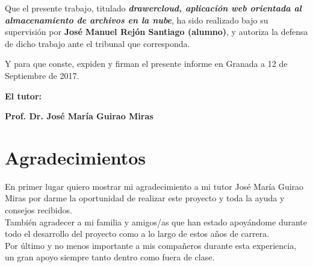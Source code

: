 \vspace{0.5cm}

Que el presente trabajo, titulado \textit{\textbf{drawercloud, aplicación web orientada al almacenamiento de archivos en la nube}},
ha sido realizado bajo su supervisión por \textbf{José Manuel Rejón Santiago (alumno)}, y autoriza la defensa de dicho trabajo ante el tribunal
que corresponda.

\vspace{0.5cm}

Y para que conste, expiden y firman el presente informe en Granada a 12 de Septiembre de 2017.

\vspace{1cm}

\textbf{El tutor:}

\vspace{5cm}

\noindent \textbf{Prof. Dr. José María Guirao Miras}

\chapter*{Agradecimientos}
\thispagestyle{empty}

       \vspace{1cm}


En primer lugar quiero mostrar mi agradecimiento a mi tutor José María Guirao Miras por darme la oportunidad de realizar este proyecto y toda la ayuda y consejos recibidos. \\

También agradecer a mi familia y amigos/as que han estado apoyándome durante todo el desarrollo del proyecto como a lo largo de estos años de carrera. \\

Por último y no menos importante a mis compañeros durante esta experiencia, un gran apoyo siempre tanto dentro como fuera de clase.



